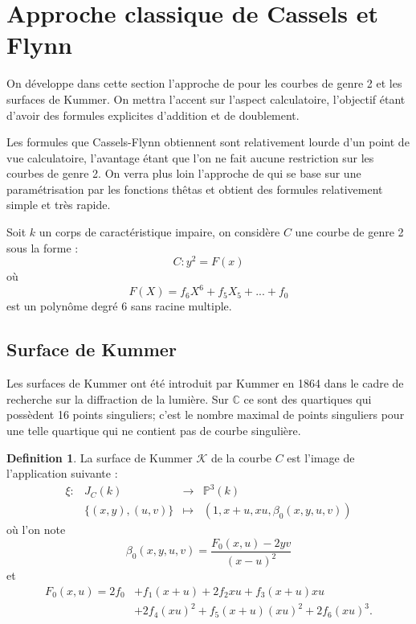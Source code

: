 \documentclass[a4paper]{article}
\theoremstyle{definition}
\newtheorem{definition}{Definition}[section]
\theoremstyle{remark}
\numberwithin{equation}{section}
\begin{document}
\section{Approche classique de Cassels et Flynn}
On développe dans cette section l'approche de \citet{cassels-Flynn} pour les courbes de genre 2 et les surfaces de Kummer. On mettra l'accent sur l'aspect calculatoire, l'objectif étant d'avoir des formules explicites d'addition et de doublement.

Les formules que Cassels-Flynn obtiennent sont relativement lourde d'un point de vue calculatoire, l'avantage étant que l'on ne fait aucune restriction sur les courbes de genre 2. On verra plus loin l'approche de \citet{gaudry} qui se base sur une paramétrisation par les fonctions thêtas et obtient des formules relativement simple et très rapide.

Soit $k$ un corps de caractéristique impaire, on considère $C$ une courbe de genre 2 sous la forme :
$$C : y^2 = F(x)$$
où $$F(X) = f_6X^6 + f_5X_5 + ... + f_0$$ est un polynôme degré 6 sans racine multiple.

\subsection{Surface de Kummer}
Les surfaces de Kummer ont été introduit par Kummer en 1864 dans le cadre de recherche sur la diffraction de la lumière. Sur $\mathbb{C}$ ce sont des quartiques qui possèdent 16 points singuliers; c'est le nombre maximal de points singuliers pour une telle quartique qui ne contient pas de courbe singulière.

\begin{definition}
La surface de Kummer $\mathcal{K}$ de la courbe $C$ est l'image de l'application suivante :
\begin{equation*}
\begin{array}{lrcl}
\xi : &J_C(k) & \longrightarrow & \mathbb{P}^3(k) \\
& \{(x,y),(u,v)\} & \longmapsto & (1,x+u,xu,\beta_0(x,y,u,v))
\end{array}
\end{equation*}
où l'on note
$$\beta_0(x,y,u,v) = \frac{F_0(x,u)-2yv}{(x-u)^2}$$
et
\begin{align*}
F_0(x,u)=2f_0&+f_1(x+u)+2f_2xu+f_3(x+u)xu \\
&+2f_4(xu)^2+f_5(x+u)(xu)^2+2f_6(xu)^3.
\end{align*}
\end{definition}
\end{document}
